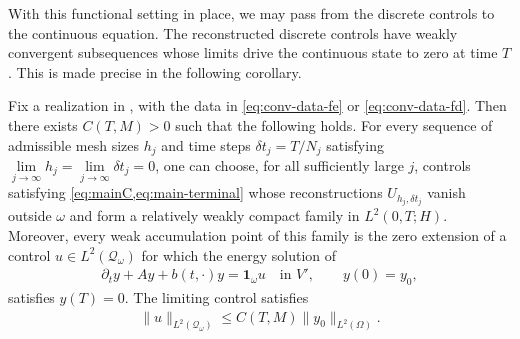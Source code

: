 \documentclass[print,wide,eng]{draft}
\begin{document}
With this functional setting in place, we may pass from the discrete controls to the continuous equation. The reconstructed discrete controls have weakly convergent subsequences whose limits drive the continuous state to zero at time $T$. This is made precise in the following corollary.
%
\begin{corollary}\label{prop:control-convergence}
Fix a realization in , with the data in \cref{eq:conv-data-fe} or \cref{eq:conv-data-fd}. Then there exists $C(T,M)>0$ such that the following holds. For every sequence of admissible mesh sizes $h_j$ and time steps $\delta t_j=T/N_j$ satisfying $\lim\limits_{j\to\infty}h_j=\lim\limits_{j\to\infty}\delta t_j=0$, one can choose, for all sufficiently large $j$, controls satisfying \cref{eq:mainC,eq:main-terminal} whose reconstructions $U_{h_j,\delta t_j}$ vanish outside $\omega$ and form a relatively weakly compact family in $L^2(0,T;H)$.
Moreover, every weak accumulation point of this family is the zero extension of a control $u\in L^2(\mathcal Q_\omega)$ for which the energy solution of
\begin{align}\label{eq:conv-continuous-system}
\partial_t y+Ay+b(t,\cdot)y=\mathbf1_\omega u\quad\text{in }V',
\qquad y(0)=y_0,
\end{align}
satisfies $y(T)=0$. The limiting control satisfies
\begin{align}\label{eq:conv-control-bound}
\|u\|_{L^2(\mathcal Q_\omega)}\le C(T,M)\|y_0\|_{L^2(\Omega)}.
\end{align}
\end{corollary}
%
\end{document}
